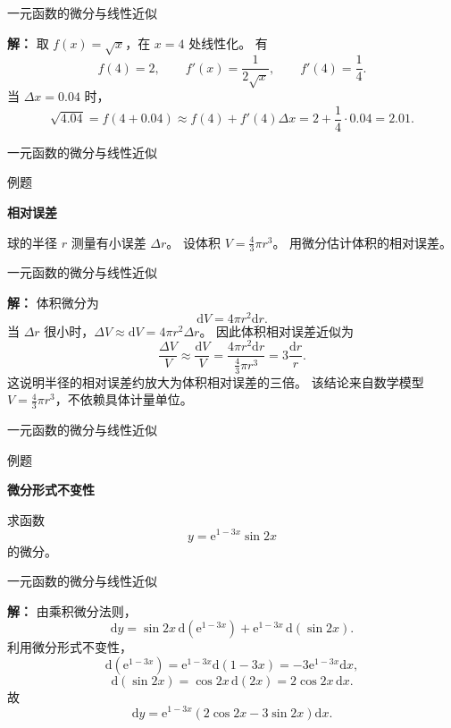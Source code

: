 \documentclass[aspectratio=169,10pt,fontset=fandol]{ctexbeamer}
\newenvironment{warning}{\par\noindent\textbf{注：}\quad}{\par\vspace{0.8em}}
\newcommand{\dd}{\mathrm{d}}
\newcommand{\ee}{\mathrm{e}}
\begin{document}
\begin{frame}[t,fragile]{一元函数的微分与线性近似}
\footnotesize
{\footnotesize
\textbf{解：}
取 $f(x)=\sqrt{x}$，在 $x=4$ 处线性化。 有
\[
f(4)=2,\qquad f'(x)=\frac{1}{2\sqrt{x}},\qquad f'(4)=\frac14.
\]
当 $\Delta x=0.04$ 时，
\[
\sqrt{4.04}=f(4+0.04)\approx f(4)+f'(4)\Delta x
=2+\frac14\cdot0.04=2.01.
\]

}
\end{frame}
\begin{frame}[t,fragile]{一元函数的微分与线性近似}
\footnotesize
\begin{block}{例题}
{\footnotesize
\textbf{相对误差}\par

球的半径 $r$ 测量有小误差 $\Delta r$。 设体积 $V=\frac43\pi r^3$。 用微分估计体积的相对误差。

}
\end{block}
\end{frame}
\begin{frame}[t,fragile]{一元函数的微分与线性近似}
\footnotesize
{\footnotesize
\textbf{解：}
体积微分为
\[
\dd V=4\pi r^2\dd r.
\]
当 $\Delta r$ 很小时，$\Delta V\approx \dd V=4\pi r^2\Delta r$。 因此体积相对误差近似为
\[
\frac{\Delta V}{V}\approx
\frac{\dd V}{V}
=\frac{4\pi r^2\dd r}{\frac43\pi r^3}
=3\frac{\dd r}{r}.
\]
这说明半径的相对误差约放大为体积相对误差的三倍。 该结论来自数学模型 $V=\frac43\pi r^3$，不依赖具体计量单位。

}
\end{frame}
\begin{frame}[t,fragile]{一元函数的微分与线性近似}
\footnotesize
\begin{block}{例题}
{\footnotesize
\textbf{微分形式不变性}\par

求函数
\[
y=\ee^{1-3x}\sin2x
\]
的微分。

}
\end{block}
\end{frame}
\begin{frame}[t,fragile]{一元函数的微分与线性近似}
\footnotesize
{\footnotesize
\textbf{解：}
由乘积微分法则，
\[
\dd y=\sin2x\,\dd(\ee^{1-3x})+\ee^{1-3x}\,\dd(\sin2x).
\]
利用微分形式不变性，
\[
\dd(\ee^{1-3x})=\ee^{1-3x}\dd(1-3x)=-3\ee^{1-3x}\dd x,
\]
\[
\dd(\sin2x)=\cos2x\,\dd(2x)=2\cos2x\,\dd x.
\]
故
\[
\dd y=\ee^{1-3x}(2\cos2x-3\sin2x)\dd x.
\]

}
\end{frame}
\end{document}
